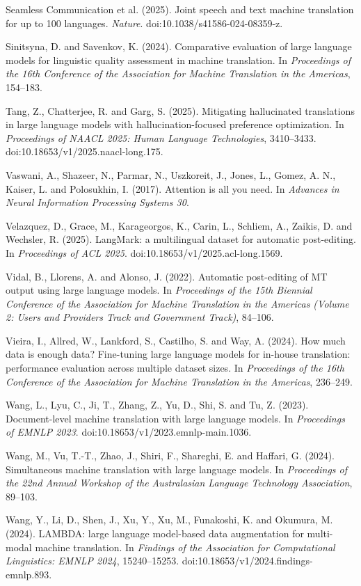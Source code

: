 \documentclass[11pt]{article}
\begin{document}
Seamless Communication et al. (2025). Joint speech and text machine translation for up to 100 languages. \emph{Nature}. doi:10.1038/s41586-024-08359-z.

Sinitsyna, D. and Savenkov, K. (2024). Comparative evaluation of large language models for linguistic quality assessment in machine translation. In \emph{Proceedings of the 16th Conference of the Association for Machine Translation in the Americas}, 154--183.

Tang, Z., Chatterjee, R. and Garg, S. (2025). Mitigating hallucinated translations in large language models with hallucination-focused preference optimization. In \emph{Proceedings of NAACL 2025: Human Language Technologies}, 3410--3433. doi:10.18653/v1/2025.naacl-long.175.

Vaswani, A., Shazeer, N., Parmar, N., Uszkoreit, J., Jones, L., Gomez, A. N., Kaiser, L. and Polosukhin, I. (2017). Attention is all you need. In \emph{Advances in Neural Information Processing Systems 30}.

Velazquez, D., Grace, M., Karageorgos, K., Carin, L., Schliem, A., Zaikis, D. and Wechsler, R. (2025). LangMark: a multilingual dataset for automatic post-editing. In \emph{Proceedings of ACL 2025}. doi:10.18653/v1/2025.acl-long.1569.

Vidal, B., Llorens, A. and Alonso, J. (2022). Automatic post-editing of MT output using large language models. In \emph{Proceedings of the 15th Biennial Conference of the Association for Machine Translation in the Americas (Volume 2: Users and Providers Track and Government Track)}, 84--106.

Vieira, I., Allred, W., Lankford, S., Castilho, S. and Way, A. (2024). How much data is enough data? Fine-tuning large language models for in-house translation: performance evaluation across multiple dataset sizes. In \emph{Proceedings of the 16th Conference of the Association for Machine Translation in the Americas}, 236--249.

Wang, L., Lyu, C., Ji, T., Zhang, Z., Yu, D., Shi, S. and Tu, Z. (2023). Document-level machine translation with large language models. In \emph{Proceedings of EMNLP 2023}. doi:10.18653/v1/2023.emnlp-main.1036.

Wang, M., Vu, T.-T., Zhao, J., Shiri, F., Shareghi, E. and Haffari, G. (2024). Simultaneous machine translation with large language models. In \emph{Proceedings of the 22nd Annual Workshop of the Australasian Language Technology Association}, 89--103.

Wang, Y., Li, D., Shen, J., Xu, Y., Xu, M., Funakoshi, K. and Okumura, M. (2024). LAMBDA: large language model-based data augmentation for multi-modal machine translation. In \emph{Findings of the Association for Computational Linguistics: EMNLP 2024}, 15240--15253. doi:10.18653/v1/2024.findings-emnlp.893.
\end{document}
